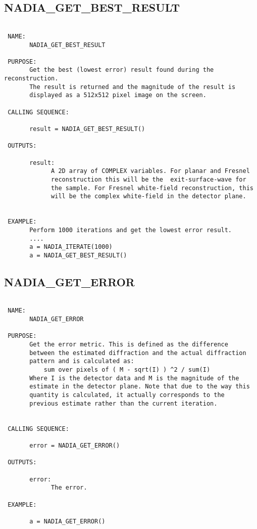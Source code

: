 \subsection{NADIA\_GET\_BEST\_RESULT}
\begin{verbatim}

 NAME:
       NADIA_GET_BEST_RESULT

 PURPOSE:
       Get the best (lowest error) result found during the reconstruction.
       The result is returned and the magnitude of the result is
       displayed as a 512x512 pixel image on the screen.

 CALLING SEQUENCE:

       result = NADIA_GET_BEST_RESULT()

 OUTPUTS:

       result:
             A 2D array of COMPLEX variables. For planar and Fresnel
             reconstruction this will be the  exit-surface-wave for
             the sample. For Fresnel white-field reconstruction, this
             will be the complex white-field in the detector plane.


 EXAMPLE:
       Perform 1000 iterations and get the lowest error result.
       ....
       a = NADIA_ITERATE(1000)
       a = NADIA_GET_BEST_RESULT()

\end{verbatim}

\subsection{NADIA\_GET\_ERROR}
\begin{verbatim}

 NAME:
       NADIA_GET_ERROR

 PURPOSE:
       Get the error metric. This is defined as the difference
       between the estimated diffraction and the actual diffraction
       pattern and is calculated as:
           sum over pixels of ( M - sqrt(I) ) ^2 / sum(I) 
       Where I is the detector data and M is the magnitude of the
       estimate in the detector plane. Note that due to the way this
       quantity is calculated, it actually corresponds to the
       previous estimate rather than the current iteration.


 CALLING SEQUENCE:

       error = NADIA_GET_ERROR()

 OUTPUTS:

       error:
             The error. 

 EXAMPLE:

       a = NADIA_GET_ERROR()

\end{verbatim}

